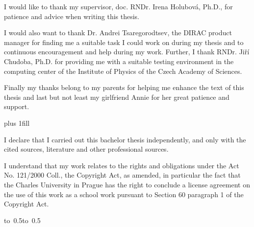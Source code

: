 \documentclass[12pt,a4paper]{report}
\let\openright=\clearpage
\begin{document}
\newpage



\openright

\noindent
I would like to thank my supervisor, doc. RNDr. Irena Holubová, Ph.D., for patience and advice when
writing this thesis. 

I would also want to thank Dr. Andrei Tsaregorodtsev, the DIRAC product manager for finding me a suitable
task I could work on during my thesis and to continuous encouragement and help during my work. 
Further, I thank RNDr. Jiří Chudoba, Ph.D. for providing me with a suitable testing
environment in the computing center of the Institute of Physics of the Czech Academy of Sciences.

Finally my thanks belong to my parents for helping me enhance the text of this thesis and last but not least my 
girlfriend Annie for her great patience and support.

\newpage


\vglue 0pt plus 1fill

\noindent
I declare that I carried out this bachelor thesis independently, and only with the cited
sources, literature and other professional sources.

\medskip\noindent
I understand that my work relates to the rights and obligations under the Act No.
121/2000 Coll., the Copyright Act, as amended, in particular the fact that the Charles
University in Prague has the right to conclude a license agreement on the use of this
work as a school work pursuant to Section 60 paragraph 1 of the Copyright Act.

\vspace{10mm}

\hbox{\hbox to 0.5\hbox to 0.5}

\vspace{20mm}
\newpage

\end{document}
